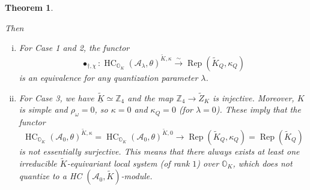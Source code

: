 \documentclass[12pt]{amsart}
\newcommand{\A}{\mathcal{A}}
\newcommand{\Orb}{\mathbb{O}}
\newcommand{\Z}{\mathbb{Z}}
\newcommand{\HC}{\operatorname{HC}}
\newtheorem{Thm}{Theorem}[subsection]
\theoremstyle{definition}
\numberwithin{equation}{section}
\begin{document}
\begin{Thm}
\begin{enumerate}
\end{enumerate}
Then
  \begin{enumerate}[(i)]
  	 \item 
  	   For Case 1 and 2, the functor \[ \bullet_{\dagger,\chi} : \HC_{\Orb_K}(\A_\lambda,\theta)^{\tilde{K},\kappa}\xrightarrow{\sim} \operatorname{Rep}(\tilde{K}_Q,\kappa_Q)\] 
  	   is an equivalence for any quantization parameter $\lambda$.
  	 \item 
  	   For Case 3, we have $\underline{\tilde{K}} \simeq \Z_4$ and the map $\Z_4 \to \tilde{Z}_K$
  	   is injective. Moreover, $K$ is simple and $\rho_\omega=0$, so $\kappa =0$ and $\kappa_Q=0$ (for $\lambda=0$). These imply that the functor
  	   \begin{equation} \label{eq:HC_bad_exc_orbits}
  	      \HC_{\Orb_K}(\A_0,\theta)^{\tilde{K},\kappa} = \HC_{\Orb_K}(\A_0,\theta)^{\tilde{K},0} \to \operatorname{Rep}(\tilde{K}_Q,\kappa_Q) = \operatorname{Rep}(\tilde{K}_Q)
        \end{equation} 
  	   is not essentially surjective. This means that there always exists at least one irreducible $\tilde{K}$-equivariant local system (of rank $1$) over $\Orb_K$, which does not quantize to a HC $(\A_0, \tilde{K})$-module.
  \end{enumerate}
\end{Thm}
\end{document}
